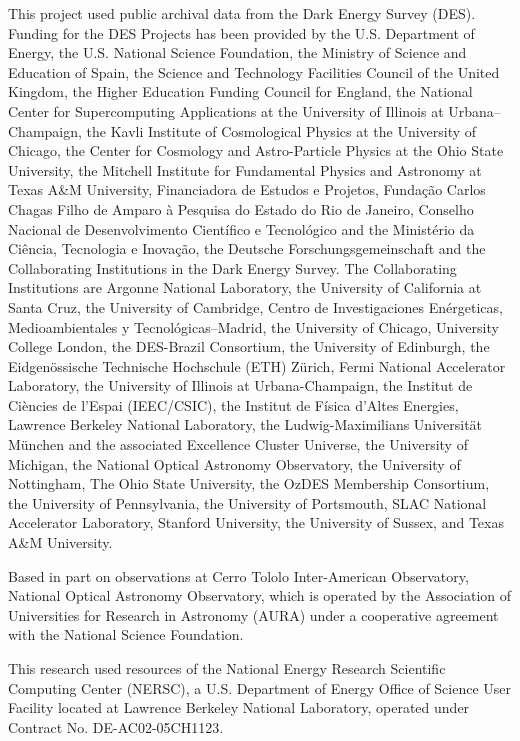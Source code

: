  This project used public archival data from the Dark Energy Survey (DES). Funding for the DES Projects has been provided by the U.S. Department of Energy, the U.S. National Science Foundation, the Ministry of Science and Education of Spain, the Science and Technology Facilities Council of the United Kingdom, the Higher Education Funding Council for England, the National Center for Supercomputing Applications at the University of Illinois at Urbana–Champaign, the Kavli Institute of Cosmological Physics at the University of Chicago, the Center for Cosmology and Astro-Particle Physics at the Ohio State University, the Mitchell Institute for Fundamental Physics and Astronomy at Texas A\&M University, Financiadora de Estudos e Projetos, Fundação Carlos Chagas Filho de Amparo à Pesquisa do Estado do Rio de Janeiro, Conselho Nacional de Desenvolvimento Científico e Tecnológico and the Ministério da Ciência, Tecnologia e Inovação, the Deutsche Forschungsgemeinschaft and the Collaborating Institutions in the Dark Energy Survey. The Collaborating Institutions are Argonne National Laboratory, the University of California at Santa Cruz, the University of Cambridge, Centro de Investigaciones Enérgeticas, Medioambientales y Tecnológicas–Madrid, the University of Chicago, University College London, the DES-Brazil Consortium, the University of Edinburgh, the Eidgenössische Technische Hochschule (ETH) Zürich, Fermi National Accelerator Laboratory, the University of Illinois at Urbana-Champaign, the Institut de Ciències de l'Espai (IEEC/CSIC), the Institut de Física d'Altes Energies, Lawrence Berkeley National Laboratory, the Ludwig-Maximilians Universität München and the associated Excellence Cluster Universe, the University of Michigan, the National Optical Astronomy Observatory, the University of Nottingham, The Ohio State University, the OzDES Membership Consortium, the University of Pennsylvania, the University of Portsmouth, SLAC National Accelerator Laboratory, Stanford University, the University of Sussex, and Texas A\&M University.

Based in part on observations at Cerro Tololo Inter-American Observatory, National Optical Astronomy Observatory, which is operated by the Association of Universities for Research in Astronomy (AURA) under a cooperative agreement with the National Science Foundation. 

This research used resources of the National Energy Research Scientific Computing Center (NERSC), a U.S. Department of Energy Office of Science User Facility located at Lawrence Berkeley National Laboratory, operated under Contract No. DE-AC02-05CH1123.

